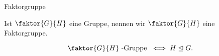 \documentclass[class=article, crop=false]{standalone}
\begin{document}
\begin{zettel}{Faktorgruppe}
\begin{flashcard}
    \begin{definition}[Faktorgruppe]
    Ist $\faktor{G}{H}$ eine Gruppe, nennen wir $\faktor{G}{H}$ eine Faktorgruppe.
    \end{definition}
\end{flashcard}

\begin{theorem}
\[
    \faktor{G}{H}\tx{-Gruppe} \iff H \trianglelefteq G
.\]
\end{theorem}
\end{zettel}
\end{document}
